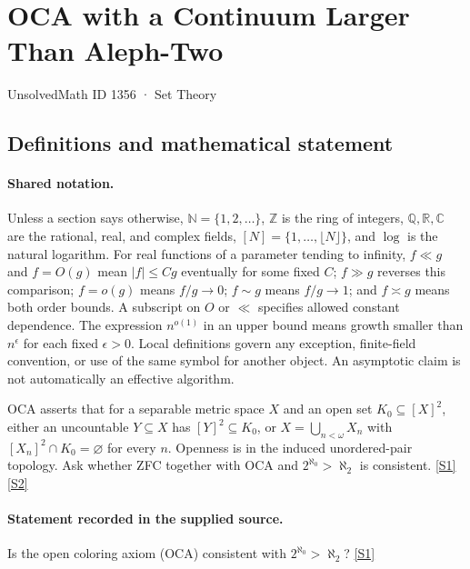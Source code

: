 \documentclass[11pt,a4paper]{article}
\newcommand{\N}{\mathbb{N}}
\newcommand{\Z}{\mathbb{Z}}
\newcommand{\Q}{\mathbb{Q}}
\newcommand{\R}{\mathbb{R}}
\newcommand{\C}{\mathbb{C}}
\newcommand{\sref}[2]{\hyperlink{source:#1:#2}{[S#2]}}
\begin{document}

\setcounter{section}{1355}

\section{OCA with a Continuum Larger Than Aleph-Two}\label{1356}

{\small\sffamily UnsolvedMath ID 1356 · Set Theory}

\subsection{Definitions and mathematical statement}

\paragraph{Shared notation.}Unless a section says otherwise, $\N=\{1,2,\ldots\}$,
$\Z$ is the ring of integers, $\Q,\R,\C$ are the rational, real, and complex
fields, $[N]=\{1,\ldots,\lfloor N\rfloor\}$, and $\log$ is the natural
logarithm. For real functions of a parameter tending to infinity,
$f\ll g$ and $f=O(g)$ mean $|f|\leq Cg$ eventually for some fixed $C$;
$f\gg g$ reverses this comparison; $f=o(g)$ means $f/g\to0$;
$f\sim g$ means $f/g\to1$; and $f\asymp g$ means both order bounds.
A subscript on $O$ or $\ll$ specifies allowed constant dependence.
The expression $n^{o(1)}$ in an upper bound means growth smaller than
$n^\epsilon$ for each fixed $\epsilon>0$. Local definitions govern any
exception, finite-field convention, or use of the same symbol for another
object. An asymptotic claim is not automatically an effective algorithm.



OCA asserts that for a separable metric space $X$ and an open set $K_0\subseteq[X]^2$, either an uncountable $Y\subseteq X$ has $[Y]^2\subseteq K_0$, or $X=\bigcup_{n<\omega}X_n$ with $[X_n]^2\cap K_0=\varnothing$ for every $n$. Openness is in the induced unordered-pair topology. Ask whether ZFC together with OCA and $2^{\aleph_0}>\aleph_2$ is consistent. \sref{1356}{1} \sref{1356}{2}

\paragraph{Statement recorded in the supplied source.}
Is the open coloring axiom (OCA) consistent with $2^{\aleph_0} > \aleph_2$? \sref{1356}{1}
\end{document}
